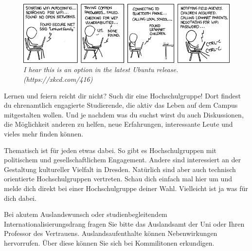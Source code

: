 \begin{figure}[b]
	\centering
	\includegraphics[width=\textwidth, keepaspectratio]{img/xkcd/zealous_autoconfig.png}
	\caption*{{\small \textit{I hear this is an option in the latest Ubuntu release. (https://xkcd.com/416)}}}
\end{figure}


Lernen und feiern reicht dir nicht?
Such dir eine Hochschulgruppe!
Dort findest du ehrenamtlich engagierte Studierende, die aktiv das Leben auf
dem Campus mitgestalten wollen.
Und je nachdem was du suchst wirst du auch Diskussionen, die Möglichkeit anderen zu helfen, neue Erfahrungen, interessante Leute und vieles mehr finden können.

Thematisch ist für jeden etwas dabei.
So gibt es Hochschulgruppen mit politischem und gesellschaftlichem Engagement.
Andere sind interessiert an der Gestaltung kultureller Vielfalt in Dresden.
Natürlich sind aber auch technisch orientierte Hochschulgruppen vertreten.
Schau dich einfach mal hier  um und melde dich direkt bei einer Hochschulgruppe deiner Wahl.
Vielleicht ist ja was für dich dabei.


Bei akutem Auslandswunsch oder studienbegleitendem Internationalisierungsdrang fragen Sie bitte das Auslandsamt der Uni oder Ihren Professor des Vertrauens.
Auslandsaufenthalte können Nebenwirkungen hervorrufen.
Über diese können Sie sich bei Kommilitonen erkundigen.

